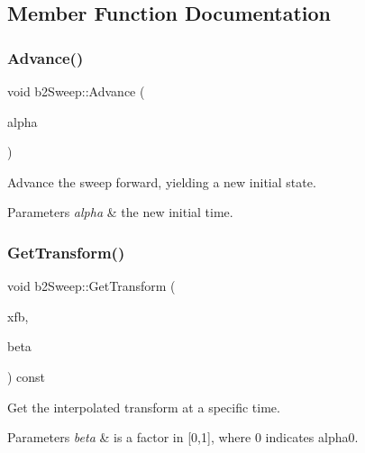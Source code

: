 \subsection{Member Function Documentation}
\mbox{\label{structb2Sweep_a35eb9b976ca87c9b8d758bec070c6c06}} 
\subsubsection{\texorpdfstring{Advance()}{Advance()}}
{\footnotesize\ttfamily void b2\+Sweep\+::\+Advance (\begin{DoxyParamCaption}\item[{float32}]{alpha }\end{DoxyParamCaption})\hspace{0.3cm}{\ttfamily [inline]}}

Advance the sweep forward, yielding a new initial state. 
\begin{DoxyParams}{Parameters}
{\em alpha} & the new initial time. \\
\hline
\end{DoxyParams}
\mbox{\label{structb2Sweep_a22ae50509de51876aefc48cd76248c61}} 
\subsubsection{\texorpdfstring{Get\+Transform()}{GetTransform()}}
{\footnotesize\ttfamily void b2\+Sweep\+::\+Get\+Transform (\begin{DoxyParamCaption}\item[{\mbox{\hyperlink{structb2Transform}{b2\+Transform}} $\ast$}]{xfb,  }\item[{float32}]{beta }\end{DoxyParamCaption}) const\hspace{0.3cm}{\ttfamily [inline]}}

Get the interpolated transform at a specific time. 
\begin{DoxyParams}{Parameters}
{\em beta} & is a factor in \mbox{[}0,1\mbox{]}, where 0 indicates alpha0. \\
\hline
\end{DoxyParams}
\mbox{\label{structb2Sweep_ad66a3086bc7656df9cf7454013a2f61b}} 
